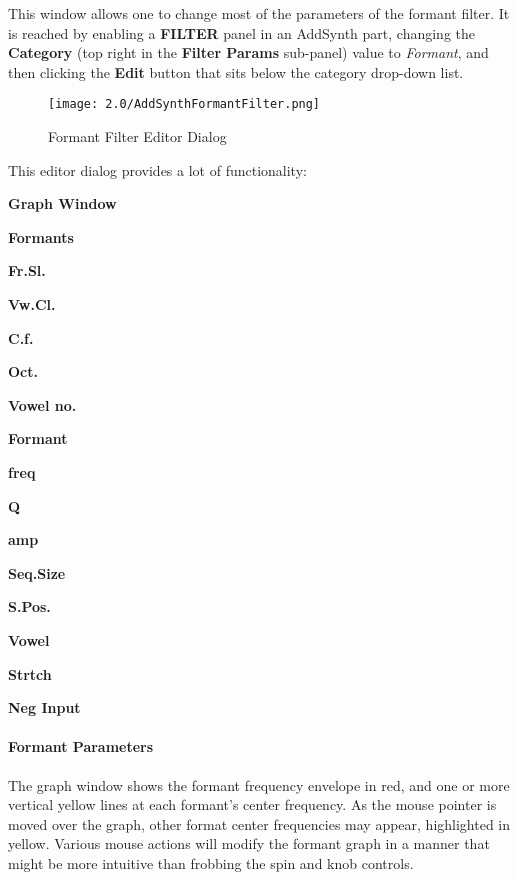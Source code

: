    This window allows one to change most of the parameters of the formant
   filter.   It is reached by enabling a \textbf{FILTER} panel in an AddSynth
   part,
   changing the \textbf{Category} (top right in the \textbf{Filter Params}
   sub-panel) value to \textsl{Formant}, and then clicking
   the \textbf{Edit} button that sits below the category drop-down list.

\begin{figure}[H]
   \centering
   \texttt{[image: 2.0/AddSynthFormantFilter.png]}
   \caption[Formant Filter Editor]{Formant Filter Editor Dialog}
   \label{fig:formant_filter_editor}
\end{figure}

   This editor dialog provides a lot of functionality:

   \begin{enumber}
      \item \textbf{Graph Window}
      \item \textbf{Formants}
      \item \textbf{Fr.Sl.}
      \item \textbf{Vw.Cl.}
      \item \textbf{C.f.}
      \item \textbf{Oct.}
      \item \textbf{Vowel no.}
      \item \textbf{Formant}
      \item \textbf{freq}
      \item \textbf{Q}
      \item \textbf{amp}
      \item \textbf{Seq.Size}
      \item \textbf{S.Pos.}
      \item \textbf{Vowel}
      \item \textbf{Strtch}
      \item \textbf{Neg Input}
   \end{enumber}

\paragraph{Formant Parameters}
\label{paragraph:formant_parameters}

   The graph window shows the formant frequency envelope in red,
   and one or more vertical yellow lines at each formant's center frequency.
   As the mouse pointer is moved over the graph, other format center
   frequencies may appear, highlighted in yellow.
   Various mouse actions will modify the formant graph in a manner that might
   be more intuitive than frobbing the spin and knob controls.

